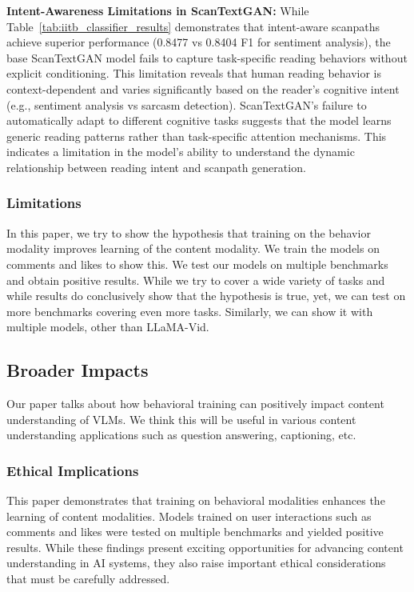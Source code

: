 \textbf{Intent-Awareness Limitations in ScanTextGAN:}
While Table~\ref{tab:iitb_classifier_results} demonstrates that intent-aware scanpaths achieve superior performance (0.8477 vs 0.8404 F1 for sentiment analysis), the base ScanTextGAN model fails to capture task-specific reading behaviors without explicit conditioning. This limitation reveals that human reading behavior is context-dependent and varies significantly based on the reader's cognitive intent (e.g., sentiment analysis vs sarcasm detection). ScanTextGAN's failure to automatically adapt to different cognitive tasks suggests that the model learns generic reading patterns rather than task-specific attention mechanisms. This indicates a limitation in the model's ability to understand the dynamic relationship between reading intent and scanpath generation.


\subsubsection{Limitations}
In this paper, we try to show the hypothesis that training on the behavior modality improves learning of the content modality. We train the models on comments and likes to show this. We test our models on multiple benchmarks and obtain positive results. While we try to cover a wide variety of tasks and while results do conclusively show that the hypothesis is true, yet, we can test on more benchmarks covering even more tasks. Similarly, we can show it with multiple models, other than LLaMA-Vid.


\subsection{Broader Impacts}
Our paper talks about how behavioral training can positively impact content understanding of VLMs. We think this will be useful in various content understanding applications such as question answering, captioning, etc. 

\subsubsection{Ethical Implications}

This paper demonstrates that training on behavioral modalities enhances the learning of content modalities. Models trained on user interactions such as comments and likes were tested on multiple benchmarks and yielded positive results. While these findings present exciting opportunities for advancing content understanding in AI systems, they also raise important ethical considerations that must be carefully addressed.

